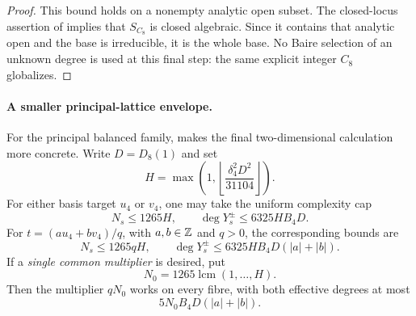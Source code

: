 \begin{proof}
This bound holds on a nonempty analytic open subset. The closed-locus assertion of  implies that $S_{C_8}$ is closed algebraic. Since it contains that analytic open and the base is irreducible, it is the whole base. No Baire selection of an unknown degree is used at this final step: the same explicit integer $C_8$ globalizes.
\end{proof}

\paragraph{A smaller principal-lattice envelope.}
For the principal balanced family,  makes the final two-dimensional calculation more concrete. Write $D=D_8(1)$ and set
\begin{equation}\label{eq:SQ-H}
 H=\max\left(1,\left\lfloor
              \frac{\delta_4^2D^2}{31104}\right\rfloor\right).
\end{equation}
For either basis target $u_4$ or $v_4$, one may take the uniform complexity cap
\begin{equation}\label{eq:SQ-principalcap}
 N_s\le1265H,\qquad
 \deg Y_s^\pm\le6325H B_4D.
\end{equation}
For $t=(a u_4+b v_4)/q$, with $a,b\in\mathbb Z$ and $q>0$, the corresponding bounds are
\begin{equation}\label{eq:SQ-generaltargetcap}
 N_s\le1265qH,\qquad
 \deg Y_s^\pm\le6325H B_4D(|a|+|b|).
\end{equation}
If a \emph{single common multiplier} is desired, put
\begin{equation}\label{eq:SQ-commonN}
 N_0=1265\operatorname{lcm}(1,\ldots,H).
\end{equation}
Then the multiplier $qN_0$ works on every fibre, with both effective degrees at most
\begin{equation}\label{eq:SQ-commonD}
 5N_0B_4D(|a|+|b|).
\end{equation}


